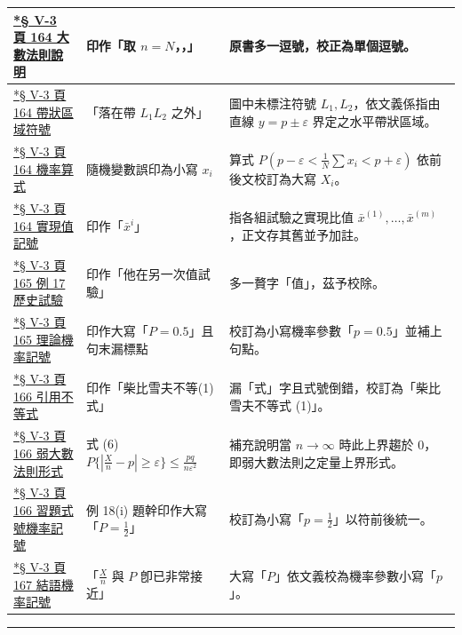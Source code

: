 \documentclass[a4paper,12pt,twoside]{article}
\begin{document}
\begin{xltabular}{\textwidth}{|p{3.2cm}|p{3.8cm}|X|}
\hyperref[note:b5-ch5-p164-comma]{*§ V-3 頁 164 大數法則說明} & 
印作「取 $n = N$，，」 & 
原書多一逗號，校正為單個逗號。 \\ \hline

\hyperref[note:b5-ch5-p164-strip]{*§ V-3 頁 164 帶狀區域符號} & 
「落在帶 $L_1 L_2$ 之外」 & 
圖中未標注符號 $L_1, L_2$，依文義係指由直線 $y = p \pm \varepsilon$ 界定之水平帶狀區域。 \\ \hline

\hyperref[note:b5-ch5-p164-rv]{*§ V-3 頁 164 機率算式} & 
隨機變數誤印為小寫 $x_i$ & 
算式 $P(p-\varepsilon < \frac{1}{N}\sum x_i < p+\varepsilon)$ 依前後文校訂為大寫 $X_i$。 \\ \hline

\hyperref[note:b5-ch5-p164-xi]{*§ V-3 頁 164 實現值記號} & 
印作「$\bar{x}^i$」 & 
指各組試驗之實現比值 $\bar{x}^{(1)}, \dots, \bar{x}^{(m)}$，正文存其舊並予加註。 \\ \hline

\hyperref[note:b5-ch5-p165-extra]{*§ V-3 頁 165 例 17 歷史試驗} & 
印作「他在另一次值試驗」 & 
多一贅字「值」，茲予校除。 \\ \hline

\hyperref[note:b5-ch5-p165-p]{*§ V-3 頁 165 理論機率記號} & 
印作大寫「$P = 0.5$」且句末漏標點 & 
校訂為小寫機率參數「$p = 0.5$」並補上句點。 \\ \hline

\hyperref[note:b5-ch5-p166-ineq1]{*§ V-3 頁 166 引用不等式} & 
印作「柴比雪夫不等(1)式」 & 
漏「式」字且式號倒錯，校訂為「柴比雪夫不等式 (1)」。 \\ \hline

\hyperref[note:b5-ch5-p166-wlln]{*§ V-3 頁 166 弱大數法則形式} & 
式 (6) $P\{|\frac{X}{n}-p| \ge \varepsilon\} \le \frac{pq}{n\varepsilon^2}$ & 
補充說明當 $n \to \infty$ 時此上界趨於 0，即弱大數法則之定量上界形式。 \\ \hline

\hyperref[note:b5-ch5-p166-p]{*§ V-3 頁 166 習題式號機率記號} & 
例 18(i) 題幹印作大寫「$P = \frac{1}{2}$」 & 
校訂為小寫「$p = \frac{1}{2}$」以符前後統一。 \\ \hline

\hyperref[note:b5-ch5-p167-p]{*§ V-3 頁 167 結語機率記號} & 
「$\frac{X}{n}$ 與 $P$ 卽已非常接近」 & 
大寫「$P$」依文義校為機率參數小寫「$p$」。 \\ \hline

\end{xltabular}

\vspace{1em}
\hrule
\vspace{1em}

\tableofcontents
\newpage


\end{document}
